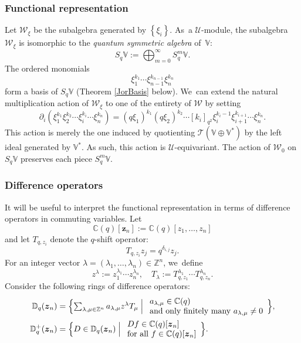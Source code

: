 \documentclass[JEP,XML,SOM,Unicode,published]{cedram}
\theoremstyle{definition}
\newcommand{\ZZ}{\mathbb{Z}}
\newcommand{\CC}{\mathbb{C}}
\newcommand{\UU}{\mathcal{U}}
\newcommand{\WW}{\mathcal{W}}
\newcommand{\del}{\partial}
\begin{document}
\subsubsection{Functional representation}
Let $\WW_{\xi}$ be the subalgebra generated by $\left\{ \xi_i \right\}$.
As~a $\UU$-module, the subalgebra $\WW_{\xi}$ is isomorphic to the \textit{quantum symmetric algebra} of~$\mathbb{V}$:
\[
S_q\mathbb{V}:=\bigoplus_{m=0}^\infty S_q^m\mathbb{V}.
\]
The ordered monomials
\[
\xi_1^{k_1}\cdots \xi_{n-1}^{k_{n-1}}\xi_n^{k_n}
\]
form a basis of $S_q\mathbb{V}$ (\cf Theorem \ref{JorBasis} below). We~can extend the natural multiplication action of $\WW_\xi$ to one of the entirety of $\WW$ by setting
\begin{equation*}
\del_i(\xi_1^{k_1}\xi_{2}^{k_{2}}\cdots \xi_{i}^{k_i}\cdots \xi_n^{k_n})=(q\xi_{1})^{k_{1}}(q\xi_{2})^{k_{2}}\cdots [k_i]_{q^2}\xi_i^{k_{i}-1}\xi_{i+1}^{k_{i+1}}\cdots \xi_n^{k_n}.
\end{equation*}
This action is merely the one induced by quotienting $\mathcal{T}(\mathbb{V}\oplus\mathbb{V}^*)$ by the left ideal generated by $\mathbb{V}^*$.
As such, this action is $\UU$-equivariant.
The action of $\WW_0$ on $S_q\mathbb{V}$ preserves each piece $S_q^m\mathbb{V}$.

\subsubsection{Difference operators}\label{WeylDiff}
It will be useful to interpret the functional representation in terms of difference operators in commuting variables.
Let
\[
\CC(q)[\boldsymbol{z}_n]:=\CC(q)[z_1,\ldots, z_n]
\]
and let $T_{q,z_i}$ denote the $q$-shift operator:
\[
T_{q,z_i}z_j=q^{\delta_{i,j}}z_j.
\]
For an integer vector $\lambda=(\lambda_1,\ldots,\lambda_n)\in\ZZ^n$, we~define
\[
z^\lambda:=z_1^{\lambda_1}\cdots z_n^{\lambda_n},\quad
T_\lambda:=T_{q,z_1}^{\lambda_1}\cdots T_{q,z_n}^{\lambda_n}.
\]
Consider the following rings of difference operators:
\begin{align*}
\mathbb{D}_q(\boldsymbol{z}_n)&= \Bigl\{ \textstyle\sum_{\lambda,\mu\in\ZZ^n}a_{\lambda,\mu}z^\lambda T_\mu\Bigm|
\begin{array}{l}
a_{\lambda,\mu}\in \CC(q) \\
\hbox{and only finitely many }a_{\lambda,\mu}\not=0
\end{array}
\Bigr\},\\
\mathbb{D}_q^+(\boldsymbol{z}_n)&= \Bigl\{ D\in \mathbb{D}_q(\boldsymbol{z}_n)\Bigm|
\begin{array}{l}
Df\in\CC(q)[\boldsymbol{z}_n]\\
\hbox{for all }f\in\CC(q)[\boldsymbol{z}_n]
\end{array}
\Bigr\}.
\end{align*}
\end{document}
